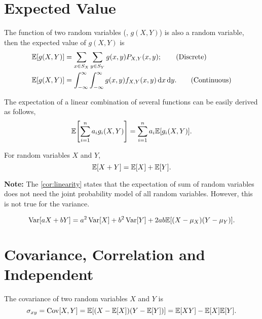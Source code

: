 \section{Expected Value}
\begin{theorem}
    The function of two random variables (\ie, $g(X,Y)$) is also a random variable, then the expected value of $g(X,Y)$ is
    \begin{align}
        \E{g(X,Y)} &= \sum_{x\in S_X}\sum_{y\in S_Y}g(x,y)P_{X,Y}(x,y); \tag{Discrete}\\
        \E{g(X,Y)} &= \int_{-\infty}^{\infty}\int_{-\infty}^{\infty}g(x,y)f_{X,Y}(x,y)\diff x\diff y. \tag{Continuous}
    \end{align}
\end{theorem}

\begin{theorem}\label{thm:linearity}
    The expectation of a linear combination of several functions can be easily derived as follows,
    \[\E{\sum_{i=1}^{n}a_i g_i(X,Y)}=\sum_{i=1}^{n}a_i\E{g_i(X,Y)}.\]
\end{theorem}

\begin{corollary}
    \label{cor:linearity}
    For random variables $X$ and $Y$,
    \[\E{X+Y}=\E{X}+\E{Y}.\]
\end{corollary}
\textbf{Note:} The \cref{cor:linearity} states that the expectation of sum of random variables does not need the joint probability model of all random variables. However, this is not true for the variance.

\begin{corollary}
    \label{thm:variance_of_sum}
    \[\Var[aX+bY]=a^2\Var[X]+b^2\Var[Y]+2ab\E{(X-\mu_X)(Y-\mu_Y)}.\]
\end{corollary}


\section{Covariance, Correlation and Independent}
\begin{definition}[Covariance]
    The covariance of two random variables $X$ and $Y$ is
    \[\sigma_{xy}=\Cov[X,Y]=\E{(X-\E{X})(Y-\E{Y})}=\E{XY}-\E{X}\E{Y}.\]
\end{definition}

